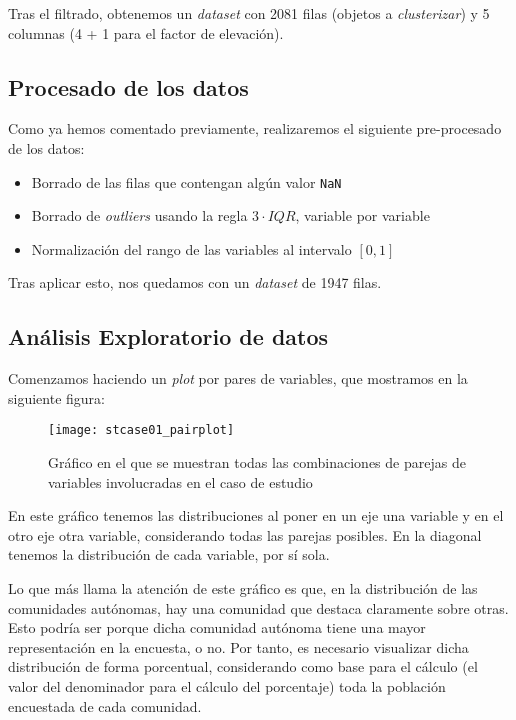 \documentclass[11pt]{article}
\begin{document}
Tras el filtrado, obtenemos un \emph{dataset} con 2081 filas (objetos a \emph{clusterizar}) y 5 columnas (4 + 1 para el factor de elevación).

\pagebreak

\subsection{Procesado de los datos}

Como ya hemos comentado previamente, realizaremos el siguiente pre-procesado de los datos:

\begin{itemize}
    \item Borrado de las filas que contengan algún valor \lstinline{NaN}
    \item Borrado de \emph{outliers} usando la regla $3 \cdot IQR$, variable por variable
    \item Normalización del rango de las variables al intervalo $[0, 1]$
\end{itemize}

Tras aplicar esto, nos quedamos con un \emph{dataset} de 1947 filas.

\pagebreak

\subsection{Análisis Exploratorio de datos}

Comenzamos haciendo un \emph{plot} por pares de variables, que mostramos en la siguiente figura:

\begin{figure}[H]
    \centering

    \texttt{[image: stcase01\_pairplot]}
    \caption{Gráfico en el que se muestran todas las combinaciones de parejas de variables involucradas en el caso de estudio}
    \label{stcase01_pairplot:figura}
\end{figure}

En este gráfico tenemos las distribuciones al poner en un eje una variable y en el otro eje otra variable, considerando todas las parejas posibles. En la diagonal tenemos la distribución de cada variable, por sí sola.

Lo que más llama la atención de este gráfico es que, en la distribución de las comunidades autónomas, hay una comunidad que destaca claramente sobre otras. Esto podría ser porque dicha comunidad autónoma tiene una mayor representación en la encuesta, o no. Por tanto, es necesario visualizar dicha distribución de forma porcentual, considerando como base para el cálculo (el valor del denominador para el cálculo del porcentaje) toda la población encuestada de cada comunidad.
\end{document}
